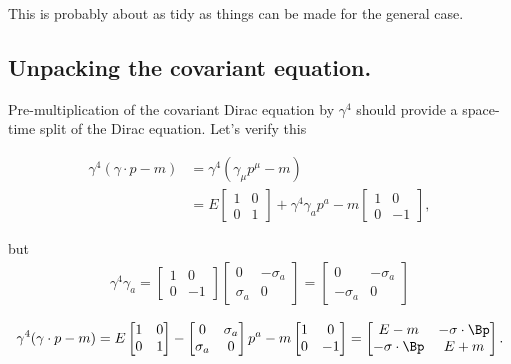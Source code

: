 This is probably about as tidy as things can be made for the general case.

\subsection{Unpacking the covariant equation.}

Pre-multiplication of the covariant Dirac equation by $\gamma^4$ should provide a space-time split of the Dirac equation.  Let's verify this

\begin{align*}
\gamma^4 (\gamma \cdot p - m)
&=
\gamma^4 (\gamma_\mu p^\mu - m) \\
&=
E
\begin{bmatrix}
1 & 0 \\
0 & 1 
\end{bmatrix}
 + \gamma^4 \gamma_a p^a - m 
\begin{bmatrix}
1 & 0 \\
0 & -1 
\end{bmatrix},
\end{align*}

but
\begin{align*}
\gamma^4 \gamma_a 
=
\begin{bmatrix}
1 & 0 \\
0 & -1 
\end{bmatrix}
\begin{bmatrix}
0 & -\sigma_a \\
\sigma_a & 0 
\end{bmatrix}
=
\begin{bmatrix}
0 & -\sigma_a \\
-\sigma_a & 0 
\end{bmatrix}
\end{align*}

\begin{equation}\label{eqn:desaiDiracAdjoint:400}
\gamma^4 (\gamma \cdot p - m)
=
E
\begin{bmatrix}
1 & 0 \\
0 & 1 
\end{bmatrix}
 - 
\begin{bmatrix}
0 & \sigma_a \\
\sigma_a & 0 
\end{bmatrix}
p^a - m 
\begin{bmatrix}
1 & 0 \\
0 & -1 
\end{bmatrix} =
\begin{bmatrix}
E - m & - \sigma \cdot \Bp \\
- \sigma \cdot \Bp & E + m
\end{bmatrix}.
\end{equation}

